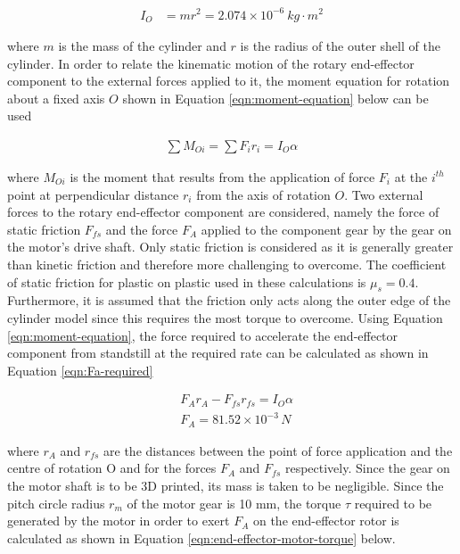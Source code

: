 \begin{align}
	I_O&=mr^2=2.074 \times 10^{-6} \: kg\cdot m^2
	\label{eqn:moment-of-inertia} 
\end{align}

where $m$ is the mass of the cylinder and $r$ is the radius of the outer shell of the cylinder. In order to relate the kinematic motion of the rotary end-effector component to the external forces applied to it, the moment equation for rotation about a fixed axis $O$ shown in Equation \ref{eqn:moment-equation} below can be used

\begin{align}
	\sum M_{Oi} =\sum F_i r_i = I_O \alpha
	\label{eqn:moment-equation}
\end{align}

where $M_{Oi}$ is the moment that results from the application of force $F_i$ at the $i^{th}$ point at perpendicular distance $r_i$ from the axis of rotation $O$. Two external forces to the rotary end-effector component are considered, namely the force of static friction $F_{fs}$ and the force $F_A$ applied to the component gear by the gear on the motor's drive shaft. Only static friction is considered as it is generally greater than kinetic friction and therefore more challenging to overcome. The coefficient of static friction for plastic on plastic used in these calculations is $\mu _s = 0.4$. Furthermore, it is assumed that the friction only acts along the outer edge of the cylinder model since this requires the most torque to overcome. Using Equation \ref{eqn:moment-equation}, the force required to accelerate the end-effector component from standstill at the required rate can be calculated as shown in Equation \ref{eqn:Fa-required}

\begin{align}
	&F_A r_A - F_{fs} r_{fs} = I_O \alpha
	\label{eqn:Fa-required} \\
	&F_A = 81.52 \times 10^{-3} \, N
\end{align}

where $r_A$ and $r_{fs}$ are the distances between the point of force application and the centre of rotation O and for the forces $F_A$ and $F_{fs}$ respectively. Since the gear on the motor shaft is to be 3D printed, its mass is taken to be negligible. Since the pitch circle radius $r_m$ of the motor gear is 10 mm, the torque $\tau$ required to be generated by the motor in order to exert $F_A$ on the end-effector rotor is calculated as shown in Equation \ref{eqn:end-effector-motor-torque} below.

